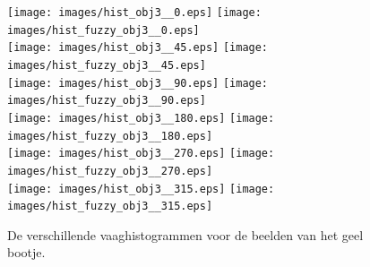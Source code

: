 
\begin{figure}[!bp]
\centering
\vspace{10pt}\texttt{[image: images/hist\_obj3\_\_0.eps]}
\texttt{[image: images/hist\_fuzzy\_obj3\_\_0.eps]}\\[5pt] %
\texttt{[image: images/hist\_obj3\_\_45.eps]}
\texttt{[image: images/hist\_fuzzy\_obj3\_\_45.eps]}\\[5pt]
\texttt{[image: images/hist\_obj3\_\_90.eps]}
\texttt{[image: images/hist\_fuzzy\_obj3\_\_90.eps]}\\[5pt] %
\texttt{[image: images/hist\_obj3\_\_180.eps]}
\texttt{[image: images/hist\_fuzzy\_obj3\_\_180.eps]}\\[5pt] %
\texttt{[image: images/hist\_obj3\_\_270.eps]}
\texttt{[image: images/hist\_fuzzy\_obj3\_\_270.eps]}\\[5pt] %
\texttt{[image: images/hist\_obj3\_\_315.eps]}
\texttt{[image: images/hist\_fuzzy\_obj3\_\_315.eps]}\\[10pt] %
\caption{\label{fig:alle_vaaghistn_geel_bootje}De verschillende vaaghistogrammen voor de beelden 
van het geel bootje.}
\end{figure}

